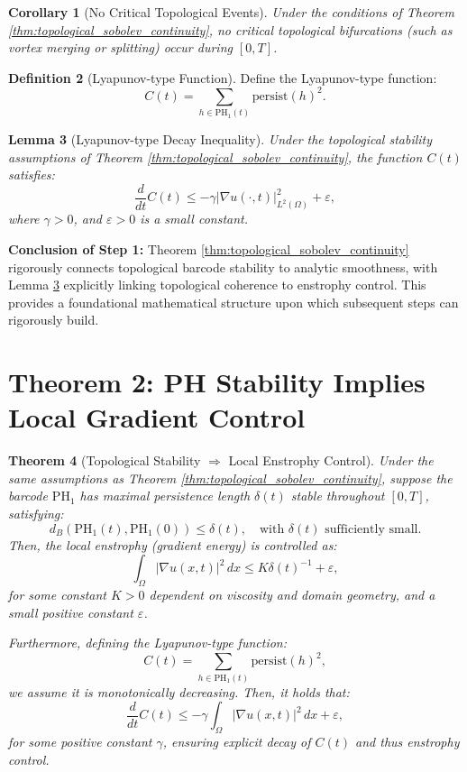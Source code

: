 \documentclass[11pt]{article}
\newtheorem{theorem}{Theorem}[section]
\newtheorem{lemma}[theorem]{Lemma}
\newtheorem{corollary}[theorem]{Corollary}
\theoremstyle{definition}
\newtheorem{definition}[theorem]{Definition}
\begin{document}
\begin{corollary}[No Critical Topological Events]
Under the conditions of Theorem \ref{thm:topological_sobolev_continuity}, no critical topological bifurcations (such as vortex merging or splitting) occur during $[0,T]$.
\end{corollary}

\begin{definition}[Lyapunov-type Function]
Define the Lyapunov-type function:
\[
C(t)=\sum_{h \in \mathrm{PH}_1(t)}\mathrm{persist}(h)^2.
\]
\end{definition}

\begin{lemma}[Lyapunov-type Decay Inequality]
\label{lem:lyapunov_decay}
Under the topological stability assumptions of Theorem \ref{thm:topological_sobolev_continuity}, the function $C(t)$ satisfies:
\[
\frac{d}{dt}C(t)\leq -\gamma |\nabla u(\cdot,t)|_{L^2(\Omega)}^2+\varepsilon,
\]
where $\gamma > 0$, and $\varepsilon > 0$ is a small constant.
\end{lemma}

\textbf{Conclusion of Step 1:} Theorem \ref{thm:topological_sobolev_continuity} rigorously connects topological barcode stability to analytic smoothness, with Lemma \ref{lem:lyapunov_decay} explicitly linking topological coherence to enstrophy control. This provides a foundational mathematical structure upon which subsequent steps can rigorously build.


\section{Theorem 2: PH Stability Implies Local Gradient Control}

\begin{theorem}[Topological Stability $\Rightarrow$ Local Enstrophy Control]
\label{thm:local_gradient_control}
Under the same assumptions as Theorem \ref{thm:topological_sobolev_continuity}, suppose the barcode $\mathrm{PH}_1$ has maximal persistence length $\delta(t)$ stable throughout $[0,T]$, satisfying:
\[
d_B(\mathrm{PH}_1(t), \mathrm{PH}_1(0)) \leq \delta(t), \quad \text{with } \delta(t) \text{ sufficiently small.}
\]
Then, the local enstrophy (gradient energy) is controlled as:
\[
\int_{\Omega} |\nabla u(x,t)|^2 \, dx \leq K\delta(t)^{-1}+\varepsilon,
\]
for some constant $K>0$ dependent on viscosity and domain geometry, and a small positive constant $\varepsilon$.

Furthermore, defining the Lyapunov-type function:
\[
C(t) = \sum_{h \in \mathrm{PH}_1(t)} \mathrm{persist}(h)^2,
\]
we assume it is monotonically decreasing. Then, it holds that:
\[
\frac{d}{dt}C(t) \leq -\gamma \int_{\Omega}|\nabla u(x,t)|^2 \, dx + \varepsilon,
\]
for some positive constant $\gamma$, ensuring explicit decay of $C(t)$ and thus enstrophy control.
\end{theorem}
\end{document}
